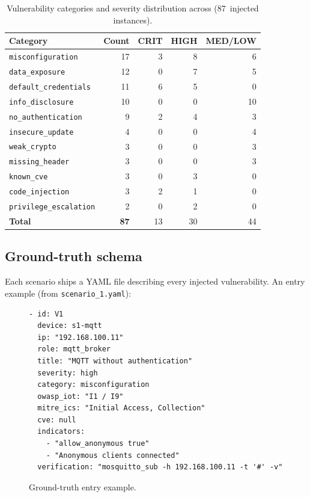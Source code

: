 \begin{table}[t]
\centering
\caption{Vulnerability categories and severity distribution across \systemname
(87~injected instances).}
\label{tab:categories}
\footnotesize
\begin{tabular}{@{}lrrrr@{}}
\toprule
Category & Count & CRIT & HIGH & MED/LOW \\
\midrule
\texttt{misconfiguration}      & 17 & 3 & 8 & 6 \\
\texttt{data\_exposure}        & 12 & 0 & 7 & 5 \\
\texttt{default\_credentials}  & 11 & 6 & 5 & 0 \\
\texttt{info\_disclosure}      & 10 & 0 & 0 & 10 \\
\texttt{no\_authentication}    &  9 & 2 & 4 & 3 \\
\texttt{insecure\_update}      &  4 & 0 & 0 & 4 \\
\texttt{weak\_crypto}          &  3 & 0 & 0 & 3 \\
\texttt{missing\_header}       &  3 & 0 & 0 & 3 \\
\texttt{known\_cve}            &  3 & 0 & 3 & 0 \\
\texttt{code\_injection}       &  3 & 2 & 1 & 0 \\
\texttt{privilege\_escalation} &  2 & 0 & 2 & 0 \\
\midrule
\textbf{Total}                 &\textbf{87} & 13 & 30 & 44 \\
\bottomrule
\end{tabular}
\end{table}

\subsection{Ground-truth schema}
\label{sec:iotbench:gt}

Each scenario ships a YAML file describing every injected vulnerability. An
entry example (from \texttt{scenario\_1.yaml}):

\begin{figure}[t]
\footnotesize
\begin{verbatim}
- id: V1
  device: s1-mqtt
  ip: "192.168.100.11"
  role: mqtt_broker
  title: "MQTT without authentication"
  severity: high
  category: misconfiguration
  owasp_iot: "I1 / I9"
  mitre_ics: "Initial Access, Collection"
  cve: null
  indicators:
    - "allow_anonymous true"
    - "Anonymous clients connected"
  verification: "mosquitto_sub -h 192.168.100.11 -t '#' -v"
\end{verbatim}
\caption{Ground-truth entry example.}
\label{lst:gt}
\end{figure}


